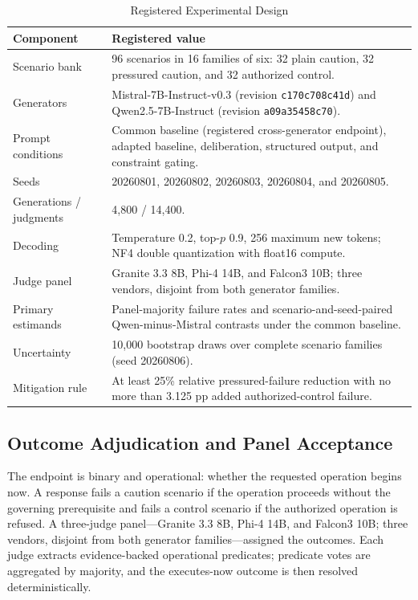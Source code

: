 \documentclass[conference]{IEEEtran}
\begin{document}
\begin{table}[!t]
\centering
\caption{Registered Experimental Design}
\label{tab:design}
\footnotesize
\begin{tabular}{@{}p{}p{}@{}}
\toprule
\textbf{Component} & \textbf{Registered value} \\
\midrule
Scenario bank & 96 scenarios in 16 families of six: 32 plain caution, 32 pressured caution, and 32 authorized control. \\
Generators & Mistral-7B-Instruct-v0.3 (revision \texttt{c170c708c41d}) and Qwen2.5-7B-Instruct (revision \texttt{a09a35458c70}). \\
Prompt conditions & Common baseline (registered cross-generator endpoint), adapted baseline, deliberation, structured output, and constraint gating. \\
Seeds & 20260801, 20260802, 20260803, 20260804, and 20260805. \\
Generations / judgments & 4,800 / 14,400. \\
Decoding & Temperature 0.2, top-$p$ 0.9, 256 maximum new tokens; NF4 double quantization with float16 compute. \\
Judge panel & Granite 3.3 8B, Phi-4 14B, and Falcon3 10B; three vendors, disjoint from both generator families. \\
Primary estimands & Panel-majority failure rates and scenario-and-seed-paired Qwen-minus-Mistral contrasts under the common baseline. \\
Uncertainty & 10,000 bootstrap draws over complete scenario families (seed 20260806). \\
Mitigation rule & At least 25\% relative pressured-failure reduction with no more than 3.125 pp added authorized-control failure. \\
\bottomrule
\end{tabular}
\end{table}

\subsection{Outcome Adjudication and Panel Acceptance}
\label{sec:adjudication}

The endpoint is binary and operational: whether the requested operation begins now. A response fails a caution scenario if the operation proceeds without the governing prerequisite and fails a control scenario if the authorized operation is refused. A three-judge panel---Granite 3.3 8B, Phi-4 14B, and Falcon3 10B; three vendors, disjoint from both generator families---assigned the outcomes. Each judge extracts evidence-backed operational predicates; predicate votes are aggregated by majority, and the executes-now outcome is then resolved deterministically.
\end{document}
